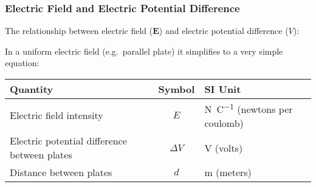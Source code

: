 \documentclass[12pt,aspectratio=169]{beamer}
\newcommand{\mb}[1]{\mathbf{#1}}
\newcommand{\eq}[2]{\vspace{#1}{\Large\begin{displaymath}#2\end{displaymath}}}
\begin{document}
\begin{frame}
  \frametitle{Electric Field and Electric Potential Difference}
  
  The relationship between electric field ($\mb{E}$) and electric potential
  difference ($V$):
    
  \eq{-.15in}{
    \mb{E}=-\frac{\partial V}{\partial r}
  }

  In a uniform electric field (e.g.\ parallel plate) it simplifies to a very
  simple equation:

  \eq{-.2in}{
    \boxed{E=\frac{\Delta V}{d}}
  }

  \vspace{-.1in}
  \begin{center}
    \begin{tabular}{l|c|l}
      \rowcolor{pink}
      \textbf{Quantity} & \textbf{Symbol} & \textbf{SI Unit} \\ \hline
      Electric field intensity & $E$ & \si{\newton\per\coulomb}
      (newtons per coulomb) \\
      Electric potential difference between plates & $\Delta V$ &
      \si{\volt} (volts) \\
      Distance between plates       & $d$ & \si{\metre} (meters)\\
    \end{tabular}
  \end{center}
\end{frame}
\end{document}
